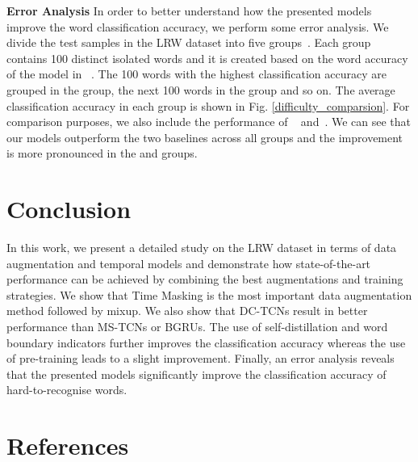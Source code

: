 \documentclass{article}
\begin{document}
\noindent\textbf{Error Analysis}\quad
In order to better understand how the presented models improve the word classification accuracy, we perform some error analysis. We divide the test samples in the LRW dataset into five groups~\cite{ma2021lip}. Each group contains 100 distinct isolated words and it is created based on the word accuracy of  the model in ~\cite{petridis2018end}. The 100 words with the highest classification accuracy are grouped in the  group, the next 100 words in the  group and so on. The average classification accuracy in each group is shown in Fig. \ref{difficulty_comparsion}. For comparison purposes, we also include the performance of ~\cite{martinez2020lipreading} and~\cite{petridis2018end}. We can see that our models outperform the two baselines across all groups and the  improvement is more pronounced in the  and  groups. 

\section{Conclusion}
In this work, we present a detailed study on the LRW dataset in terms of data augmentation and temporal models and demonstrate how state-of-the-art performance can be achieved by combining the best augmentations and training strategies. We show that Time Masking is the most important data augmentation method followed by mixup. We also show that DC-TCNs result in better performance than MS-TCNs or BGRUs. The use of self-distillation and word boundary indicators further improves the classification accuracy whereas the use of pre-training leads to a slight improvement. Finally, an error analysis reveals that the presented models significantly improve the classification accuracy of hard-to-recognise words.

\clearpage
\section{References}
\begingroup
\printbibliography[heading=none]
\endgroup
\end{document}
